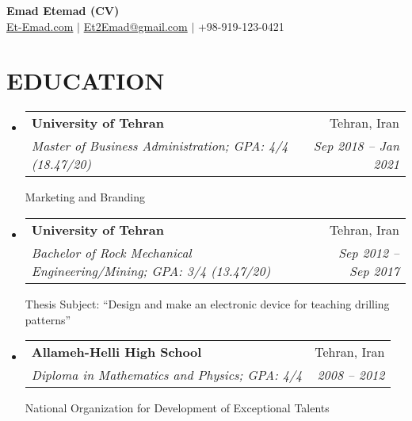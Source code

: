\documentclass[letterpaper,11pt]{article}
\makeatletter
\newcommand{\resumeSubheading}[4]{
  \vspace{5pt}\item
    \begin{tabular*}{0.97\textwidth}{l@{\extracolsep{\fill}}r}
      \textbf{#1} & #2 \\
      \textit{\small#3} & \textit{\small #4} \\
    \end{tabular*}\vspace{-5pt}
}
\newcommand{\resumeSubHeadingListStart}{\begin{itemize}[leftmargin=*]}
\newcommand{\resumeSubHeadingListEnd}{\end{itemize}}
\makeatother
\begin{document}
 \begin{center}
{\color{darkgray}
\textbf{{\LARGE {\centering Emad Etemad (CV)}} \vspace{7pt}}} \\

\href{https://Et-Emad.com}{{\color{teal}} Et-Emad.com} \hspace{5pt} $|$ \hspace{5pt}
 \href{mailto:Et2Emad@gmail.com} {{\color{teal}} Et2Emad@gmail.com} \hspace{5pt} $|$ \hspace{5pt}
{\color{teal}} +98-919-123-0421
 \hspace{5pt}
  \end{center}
\section{EDUCATION}
  \resumeSubHeadingListStart   
    \resumeSubheading
      {University of Tehran}{Tehran, Iran}
      {Master of Business Administration; GPA: 4/4 (18.47/20) \vspace{4pt}}{Sep 2018 -- Jan 2021}
      {Marketing and Branding}

    \resumeSubheading
      {University of Tehran}{Tehran, Iran}
      {Bachelor of Rock Mechanical Engineering/Mining;  GPA: 3/4 (13.47/20) \vspace{4pt}}{Sep 2012 -- Sep 2017}
      {Thesis Subject: “Design and make an electronic device for teaching drilling patterns”}

    \resumeSubheading
      {Allameh-Helli High School}{Tehran, Iran}
      {Diploma in Mathematics and Physics; GPA: 4/4 \vspace{4pt}}{2008 -- 2012}
      {National Organization for Development of Exceptional Talents}
  \resumeSubHeadingListEnd
  
\end{document}

